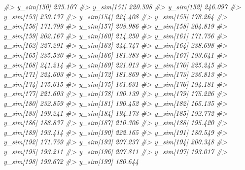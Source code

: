 \documentclass[
  10pt,
  italian,
  a4paper,
  extrafontsizes,onecolumn,openright
  ]{memoir}
\newenvironment{Shaded}{\begin{snugshade}}{\end{snugshade}}
\newcommand{\CommentTok}[1]{\textcolor[rgb]{0.56,0.35,0.01}{\textit{#1}}}
\begin{document}
\begin{Shaded}
\begin{Highlighting}[]
\CommentTok{\#\textgreater{}   y\_sim[150] 235.107}
\CommentTok{\#\textgreater{}   y\_sim[151] 220.598}
\CommentTok{\#\textgreater{}   y\_sim[152] 246.097}
\CommentTok{\#\textgreater{}   y\_sim[153] 239.137}
\CommentTok{\#\textgreater{}   y\_sim[154] 224.408}
\CommentTok{\#\textgreater{}   y\_sim[155] 178.264}
\CommentTok{\#\textgreater{}   y\_sim[156] 171.799}
\CommentTok{\#\textgreater{}   y\_sim[157] 208.986}
\CommentTok{\#\textgreater{}   y\_sim[158] 204.819}
\CommentTok{\#\textgreater{}   y\_sim[159] 202.167}
\CommentTok{\#\textgreater{}   y\_sim[160] 214.250}
\CommentTok{\#\textgreater{}   y\_sim[161] 171.756}
\CommentTok{\#\textgreater{}   y\_sim[162] 227.291}
\CommentTok{\#\textgreater{}   y\_sim[163] 244.747}
\CommentTok{\#\textgreater{}   y\_sim[164] 238.698}
\CommentTok{\#\textgreater{}   y\_sim[165] 235.530}
\CommentTok{\#\textgreater{}   y\_sim[166] 181.383}
\CommentTok{\#\textgreater{}   y\_sim[167] 193.641}
\CommentTok{\#\textgreater{}   y\_sim[168] 241.214}
\CommentTok{\#\textgreater{}   y\_sim[169] 221.013}
\CommentTok{\#\textgreater{}   y\_sim[170] 225.245}
\CommentTok{\#\textgreater{}   y\_sim[171] 224.603}
\CommentTok{\#\textgreater{}   y\_sim[172] 181.869}
\CommentTok{\#\textgreater{}   y\_sim[173] 236.813}
\CommentTok{\#\textgreater{}   y\_sim[174] 175.615}
\CommentTok{\#\textgreater{}   y\_sim[175] 161.631}
\CommentTok{\#\textgreater{}   y\_sim[176] 194.181}
\CommentTok{\#\textgreater{}   y\_sim[177] 221.603}
\CommentTok{\#\textgreater{}   y\_sim[178] 190.139}
\CommentTok{\#\textgreater{}   y\_sim[179] 175.226}
\CommentTok{\#\textgreater{}   y\_sim[180] 232.859}
\CommentTok{\#\textgreater{}   y\_sim[181] 190.452}
\CommentTok{\#\textgreater{}   y\_sim[182] 165.135}
\CommentTok{\#\textgreater{}   y\_sim[183] 199.241}
\CommentTok{\#\textgreater{}   y\_sim[184] 194.173}
\CommentTok{\#\textgreater{}   y\_sim[185] 192.772}
\CommentTok{\#\textgreater{}   y\_sim[186] 188.837}
\CommentTok{\#\textgreater{}   y\_sim[187] 210.306}
\CommentTok{\#\textgreater{}   y\_sim[188] 195.420}
\CommentTok{\#\textgreater{}   y\_sim[189] 193.414}
\CommentTok{\#\textgreater{}   y\_sim[190] 222.165}
\CommentTok{\#\textgreater{}   y\_sim[191] 180.549}
\CommentTok{\#\textgreater{}   y\_sim[192] 171.759}
\CommentTok{\#\textgreater{}   y\_sim[193] 207.237}
\CommentTok{\#\textgreater{}   y\_sim[194] 200.348}
\CommentTok{\#\textgreater{}   y\_sim[195] 193.211}
\CommentTok{\#\textgreater{}   y\_sim[196] 207.811}
\CommentTok{\#\textgreater{}   y\_sim[197] 193.017}
\CommentTok{\#\textgreater{}   y\_sim[198] 199.672}
\CommentTok{\#\textgreater{}   y\_sim[199] 180.644}

\end{Highlighting}
\end{Shaded}
\end{document}
